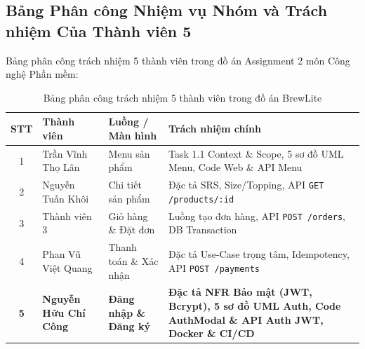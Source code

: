 \documentclass[a4paper]{article}
\begin{document}
\subsection{Bảng Phân công Nhiệm vụ Nhóm và Trách nhiệm Của Thành viên 5}
Bảng phân công trách nhiệm 5 thành viên trong đồ án Assignment 2 môn Công nghệ Phần mềm:

\begin{table}[H]
\centering
\small
\begin{tabularx}{\textwidth}{|c|p{3.6cm}|p{3.4cm}|X|}
\hline
\textbf{STT} & \textbf{Thành viên} & \textbf{Luồng / Màn hình} & \textbf{Trách nhiệm chính} \\ \hline
1 & Trần Vĩnh Thọ Lân & Menu sản phẩm & Task 1.1 Context \& Scope, 5 sơ đồ UML Menu, Code Web \& API Menu \\ \hline
2 & Nguyễn Tuấn Khôi & Chi tiết sản phẩm & Đặc tả SRS, Size/Topping, API \texttt{GET /products/:id} \\ \hline
3 & Thành viên 3 & Giỏ hàng \& Đặt đơn & Luồng tạo đơn hàng, API \texttt{POST /orders}, DB Transaction \\ \hline
4 & Phan Vũ Việt Quang & Thanh toán \& Xác nhận & Đặc tả Use-Case trọng tâm, Idempotency, API \texttt{POST /payments} \\ \hline
\textbf{5} & \textbf{Nguyễn Hữu Chí Công} & \textbf{Đăng nhập \& Đăng ký} & \textbf{Đặc tả NFR Bảo mật (JWT, Bcrypt), 5 sơ đồ UML Auth, Code AuthModal \& API Auth JWT, Docker \& CI/CD} \\ \hline
\end{tabularx}
\caption{Bảng phân công trách nhiệm 5 thành viên trong đồ án BrewLite}
\label{tab:team_roles}
\end{table}
\end{document}
